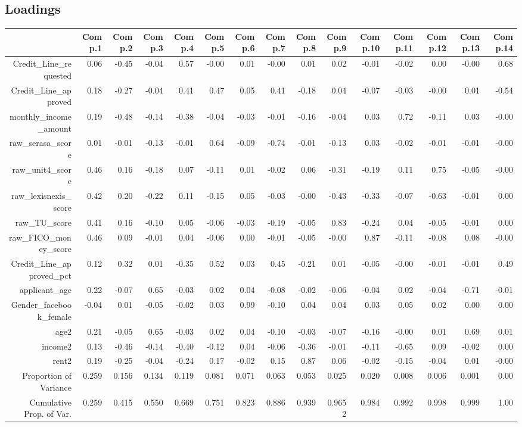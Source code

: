\documentclass[a4paper, landscape]{article}
\begin{document}
\subsection{Loadings}
\begin{table}[ht]
\centering
\begin{tabular}{rrrrrrrrrrrrrrr}
  \hline
 & Comp.1 & Comp.2 & Comp.3 & Comp.4 & Comp.5 & Comp.6 & Comp.7 & Comp.8 & Comp.9 & Comp.10 & Comp.11 & Comp.12 & Comp.13 & Comp.14 \\ 
  \hline
Credit\_Line\_requested & 0.06 & -0.45 & -0.04 & 0.57 & -0.00 & 0.01 & -0.00 & 0.01 & 0.02 & -0.01 & -0.02 & 0.00 & -0.00 & 0.68 \\ 
  Credit\_Line\_approved & 0.18 & -0.27 & -0.04 & 0.41 & 0.47 & 0.05 & 0.41 & -0.18 & 0.04 & -0.07 & -0.03 & -0.00 & 0.01 & -0.54 \\ 
  monthly\_income\_amount & 0.19 & -0.48 & -0.14 & -0.38 & -0.04 & -0.03 & -0.01 & -0.16 & -0.04 & 0.03 & 0.72 & -0.11 & 0.03 & -0.00 \\ 
  raw\_serasa\_score & 0.01 & -0.01 & -0.13 & -0.01 & 0.64 & -0.09 & -0.74 & -0.01 & -0.13 & 0.03 & -0.02 & -0.01 & -0.01 & -0.00 \\ 
  raw\_unit4\_score & 0.46 & 0.16 & -0.18 & 0.07 & -0.11 & 0.01 & -0.02 & 0.06 & -0.31 & -0.19 & 0.11 & 0.75 & -0.05 & -0.00 \\ 
  raw\_lexisnexis\_score & 0.42 & 0.20 & -0.22 & 0.11 & -0.15 & 0.05 & -0.03 & -0.00 & -0.43 & -0.33 & -0.07 & -0.63 & -0.01 & 0.00 \\ 
  raw\_TU\_score & 0.41 & 0.16 & -0.10 & 0.05 & -0.06 & -0.03 & -0.19 & -0.05 & 0.83 & -0.24 & 0.04 & -0.05 & -0.01 & 0.00 \\ 
  raw\_FICO\_money\_score & 0.46 & 0.09 & -0.01 & 0.04 & -0.06 & 0.00 & -0.01 & -0.05 & -0.00 & 0.87 & -0.11 & -0.08 & 0.08 & -0.00 \\ 
  Credit\_Line\_approved\_pct & 0.12 & 0.32 & 0.01 & -0.35 & 0.52 & 0.03 & 0.45 & -0.21 & 0.01 & -0.05 & -0.00 & -0.01 & -0.01 & 0.49 \\ 
  applicant\_age & 0.22 & -0.07 & 0.65 & -0.03 & 0.02 & 0.04 & -0.08 & -0.02 & -0.06 & -0.04 & 0.02 & -0.04 & -0.71 & -0.01 \\ 
  Gender\_facebook\_female & -0.04 & 0.01 & -0.05 & -0.02 & 0.03 & 0.99 & -0.10 & 0.04 & 0.04 & 0.03 & 0.05 & 0.02 & 0.00 & 0.00 \\ 
  age2 & 0.21 & -0.05 & 0.65 & -0.03 & 0.02 & 0.04 & -0.10 & -0.03 & -0.07 & -0.16 & -0.00 & 0.01 & 0.69 & 0.01 \\ 
  income2 & 0.13 & -0.46 & -0.14 & -0.40 & -0.12 & 0.04 & -0.06 & -0.36 & -0.01 & -0.11 & -0.65 & 0.09 & -0.02 & 0.00 \\ 
  rent2 & 0.19 & -0.25 & -0.04 & -0.24 & 0.17 & -0.02 & 0.15 & 0.87 & 0.06 & -0.02 & -0.15 & -0.04 & 0.01 & -0.00 \\ 
   \hline
	Proportion of Variance &  0.259 & 0.156 & 0.134 & 0.119 & 0.081 & 0.071 & 0.063 & 0.053 & 0.025 &  0.020& 0.008 & 0.006 & 0.001 & 0.00\\
   Cumulative Prop. of Var. & 0.259 & 0.415 & 0.550 & 0.669 & 0.751 & 0.823 & 0.886 & 0.939 & 0.9652 & 0.984 & 0.992 & 0.998 & 0.999 & 1.00 \\
   \hline
\end{tabular}
\end{table}
\end{document}
